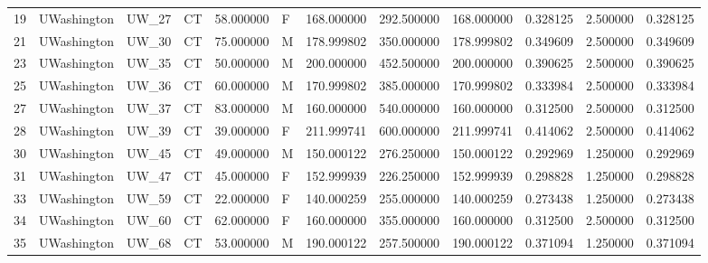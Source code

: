 \begin{tabular}{llllrlrrrrrr}
19     &     UWashington &        UW\_27 &                 CT &  58.000000 &        F &       168.000000 &    292.500000 &  168.000000 &               0.328125 &            2.500000 &          0.328125 \\
21     &     UWashington &        UW\_30 &                 CT &  75.000000 &        M &       178.999802 &    350.000000 &  178.999802 &               0.349609 &            2.500000 &          0.349609 \\
23     &     UWashington &        UW\_35 &                 CT &  50.000000 &        M &       200.000000 &    452.500000 &  200.000000 &               0.390625 &            2.500000 &          0.390625 \\
25     &     UWashington &        UW\_36 &                 CT &  60.000000 &        M &       170.999802 &    385.000000 &  170.999802 &               0.333984 &            2.500000 &          0.333984 \\
27     &     UWashington &        UW\_37 &                 CT &  83.000000 &        M &       160.000000 &    540.000000 &  160.000000 &               0.312500 &            2.500000 &          0.312500 \\
28     &     UWashington &        UW\_39 &                 CT &  39.000000 &        F &       211.999741 &    600.000000 &  211.999741 &               0.414062 &            2.500000 &          0.414062 \\
30     &     UWashington &        UW\_45 &                 CT &  49.000000 &        M &       150.000122 &    276.250000 &  150.000122 &               0.292969 &            1.250000 &          0.292969 \\
31     &     UWashington &        UW\_47 &                 CT &  45.000000 &        F &       152.999939 &    226.250000 &  152.999939 &               0.298828 &            1.250000 &          0.298828 \\
33     &     UWashington &        UW\_59 &                 CT &  22.000000 &        F &       140.000259 &    255.000000 &  140.000259 &               0.273438 &            1.250000 &          0.273438 \\
34     &     UWashington &        UW\_60 &                 CT &  62.000000 &        F &       160.000000 &    355.000000 &  160.000000 &               0.312500 &            2.500000 &          0.312500 \\
35     &     UWashington &        UW\_68 &                 CT &  53.000000 &        M &       190.000122 &    257.500000 &  190.000122 &               0.371094 &            1.250000 &          0.371094 \\

\end{tabular}
